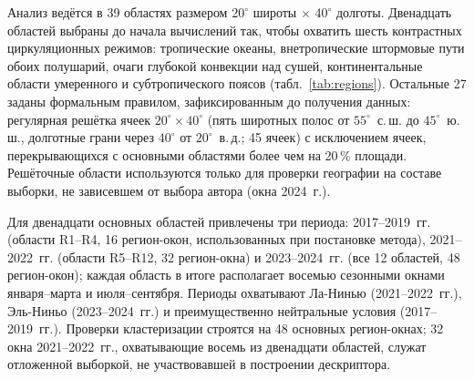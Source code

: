 \documentclass[11pt,a4paper]{article}
\begin{document}
Анализ ведётся в 39 областях размером $20^\circ$ широты $\times$ $40^\circ$ долготы. Двенадцать областей выбраны до начала вычислений так, чтобы охватить шесть контрастных циркуляционных режимов: тропические океаны, внетропические штормовые пути обоих полушарий, очаги глубокой конвекции над сушей, континентальные области умеренного и субтропического поясов (табл.~\ref{tab:regions}). Остальные 27 заданы формальным правилом, зафиксированным до получения данных: регулярная решётка ячеек $20^\circ\times40^\circ$ (пять широтных полос от $55^\circ$~с.\,ш. до $45^\circ$~ю.\,ш., долготные грани через $40^\circ$ от $20^\circ$~в.\,д.; 45 ячеек) с исключением ячеек, перекрывающихся с основными областями более чем на 20\,\% площади. Решёточные области используются только для проверки географии на составе выборки, не зависевшем от выбора автора (окна 2024~г.).

Для двенадцати основных областей привлечены три периода: 2017--2019~гг. (области R1--R4, 16 регион-окон, использованных при постановке метода), 2021--2022~гг. (области R5--R12, 32 регион-окна) и 2023--2024~гг. (все 12 областей, 48 регион-окон); каждая область в итоге располагает восемью сезонными окнами января--марта и июля--сентября. Периоды охватывают Ла-Нинью (2021--2022~гг.), Эль-Ниньо (2023--2024~гг.) и преимущественно нейтральные условия (2017--2019~гг.). Проверки кластеризации строятся на 48 основных регион-окнах; 32 окна 2021--2022~гг., охватывающие восемь из двенадцати областей, служат отложенной выборкой, не участвовавшей в построении дескриптора.
\end{document}
